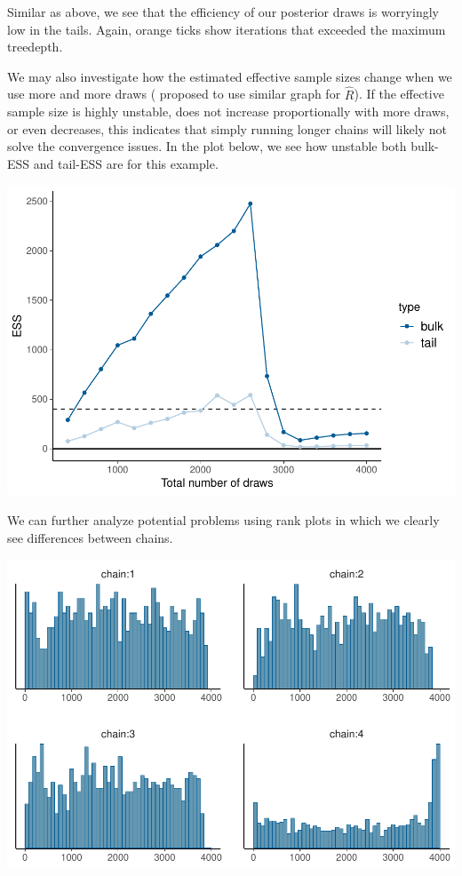 \documentclass[american,]{article}
\begin{document}
Similar as above, we see that the efficiency of our posterior draws is
worryingly low in the tails. Again, orange ticks show iterations that
exceeded the maximum treedepth.

We may also investigate how the estimated effective sample sizes change
when we use more and more draws (\citet{Brooks+Gelman:1998} proposed to
use similar graph for \(\widehat{R}\)). If the effective sample size is
highly unstable, does not increase proportionally with more draws, or
even decreases, this indicates that simply running longer chains will
likely not solve the convergence issues. In the plot below, we see how
unstable both bulk-ESS and tail-ESS are for this example.

\includegraphics{graphics/change-ess-fit-nom-1.pdf}

We can further analyze potential problems using rank plots in which we
clearly see differences between chains.

\includegraphics{graphics/hist-fit-nom-1.pdf}
\end{document}
